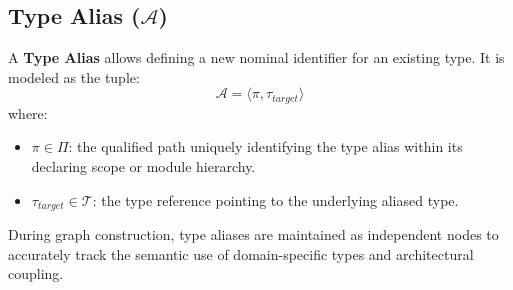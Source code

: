 %
%

\subsection{Type Alias ($\mathcal{A}$)}
A \textbf{Type Alias} allows defining a new nominal identifier for an
existing type. It is modeled as the tuple:
$$\mathcal{A} = \langle \pi, \tau_{target} \rangle$$
where:
\begin{itemize}
  \item $\pi \in \Pi$: the qualified path uniquely identifying the
    type alias within its declaring scope or module hierarchy.
  \item $\tau_{target} \in \mathcal{T}$: the type reference pointing to the
    underlying aliased type.
\end{itemize}

During graph construction, type aliases are maintained as independent nodes
to accurately track the semantic use of domain-specific types and architectural
coupling.


